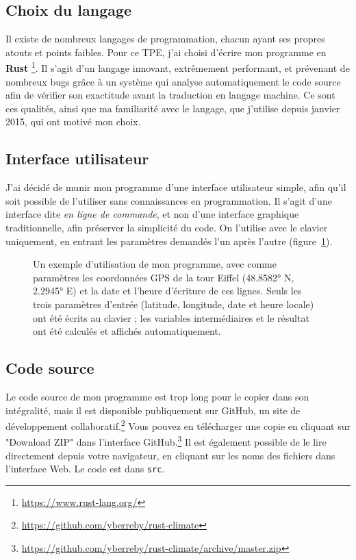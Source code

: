 \documentclass[12pt]{article}
\begin{document}
\subsection{Choix du langage}
Il existe de nombreux langages de programmation, chacun ayant ses propres atouts et points faibles.
Pour ce TPE, j'ai choisi d'écrire mon programme en \textbf{Rust} \footnote{\url{https://www.rust-lang.org/}}.
Il s'agit d'un langage innovant, extrêmement performant, et prévenant de nombreux bugs grâce à un système qui analyse automatiquement le code source afin de vérifier son exactitude avant la traduction en langage machine.
Ce sont ces qualités, ainsi que ma familiarité avec le langage, que j'utilise depuis janvier 2015, qui ont motivé mon choix.

\subsection{Interface utilisateur}
J'ai décidé de munir mon programme d'une interface utilisateur simple, afin qu'il soit possible de l'utiliser sans connaissances en programmation. Il s'agit d'une interface dite \emph{en ligne de commande}, et non d'une interface graphique traditionnelle, afin préserver la simplicité du code. On l'utilise avec le clavier uniquement, en entrant les paramètres demandés l'un après l'autre (figure~\ref{fig:demo}).

\begin{figure}[!htbp]
  \centering
  \caption{Un exemple d'utilisation de mon programme, avec comme paramètres les coordonnées GPS de la tour Eiffel (48.8582° N, 2.2945° E) et la date et l'heure d'écriture de ces lignes. Seuls les trois paramètres d'entrée (latitude, longitude, date et heure locale) ont été écrits au clavier ; les variables intermédiaires et le résultat ont été calculés et affichés automatiquement.}
  \label{fig:demo}
\end{figure}

\FloatBarrier
\subsection{Code source}
Le code source de mon programme est trop long pour le copier dans son intégralité, mais il est disponible publiquement sur GitHub, un site de développement collaboratif.\footnote{\url{https://github.com/yberreby/rust-climate}}
Vous pouvez en télécharger une copie en cliquant sur "Download ZIP" dans l'interface GitHub.\footnote{\url{https://github.com/yberreby/rust-climate/archive/master.zip}}
Il est également possible de le lire directement depuis votre navigateur, en cliquant sur les noms des fichiers dans l'interface Web.
Le code est dans \texttt{src}.
\end{document}
